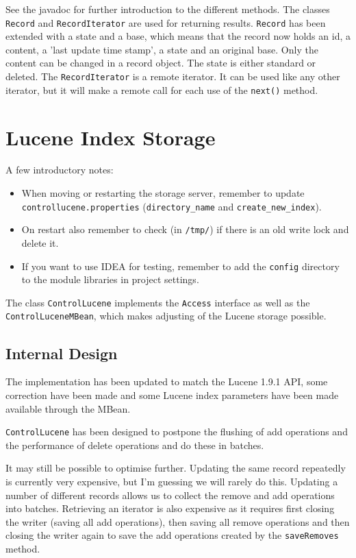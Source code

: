 \documentclass[a4paper,12pt]{article}
\begin{document}
See the javadoc for further introduction to the different methods. The
classes \texttt{Record} and \texttt{RecordIterator} are used for
returning results. \texttt{Record} has been extended with a state and
a base, which means that the record now holds an id, a content, a
'last update time stamp', a state and an original base. Only the
content can be changed in a record object. The state is either
standard or deleted. The \texttt{RecordIterator} is a remote
iterator. It can be used like any other iterator, but it will make a
remote call for each use of the \texttt{next()} method.
 
\section{Lucene Index Storage}

A few introductory notes:

\begin{itemize}
\item{When moving or restarting the storage server, remember to update
\texttt{controllucene.properties} (\texttt{directory\_name} and
\texttt{create\_new\_index}).}
\item{On restart also remember to check (in \texttt{/tmp/}) if there
  is an old write lock and delete it.}
\item{If you want to use IDEA for testing, remember to add the
  \texttt{config} directory to the module libraries in project settings.}
\end{itemize}

The class \texttt{ControlLucene} implements the \texttt{Access}
interface as well as the \texttt{ControlLuceneMBean}, which makes
adjusting of the Lucene storage possible.

\subsection{Internal Design}

The implementation has been updated to match the Lucene 1.9.1 API,
some correction have been made and some Lucene index parameters have
been made available through the MBean.

\texttt{ControlLucene} has been designed to postpone the flushing of
add operations and the performance of delete operations and do these
in batches.

It may still be possible to optimise further. Updating the same record
repeatedly is currently very expensive, but I'm guessing we will
rarely do this. Updating a number of different records allows us to
collect the remove and add operations into batches. Retrieving an
iterator is also expensive as it requires first closing the writer
(saving all add operations), then saving all remove operations and
then closing the writer again to save the add operations created by
the \texttt{saveRemoves} method.
\end{document}
